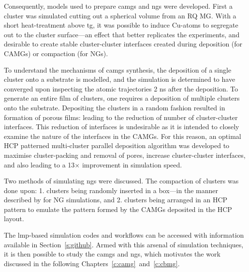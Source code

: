 Consequently, models used to prepare \gls{camg}s and \gls{ng}s were developed. First a cluster was simulated cutting out a spherical volume from an RQ MG. With a short heat-treatment above \gls{tg}, it was possible to induce Cu-atoms to segregate out to the cluster surface---an effect that better replicates the experiments, and desirable to create stable cluster-cluster interfaces created during deposition (for CAMGs) or compaction (for NGs). \par

To understand the mechanisms of \gls{camg}s synthesis, the deposition of a single cluster onto a substrate is modelled, and the simulation is determined to have converged upon inspecting the atomic trajectories 2 ns after the deposition. To generate an entire film of clusters, one requires a deposition of multiple clusters onto the substrate. Depositing the clusters in a random fashion resulted in formation of porous films: leading to the reduction of number of cluster-cluster interfaces. This reduction of interfaces is undesirable as it is intended to closely examine the nature of the interfaces in the CAMGs. For this reason, an optimal HCP patterned multi-cluster parallel deposition algorithm was developed to maximise cluster-packing and removal of pores, increase cluster-cluster interfaces, and also leading to a 13$\times$ improvement in simulation speed. \par

Two methods of simulating \gls{ng}s were discussed. The compaction of clusters was done upon: 1. clusters being randomly inserted in a box---in the manner described by \textcite{Adjaoud2018} for NG simulations, and 2. clusters being arranged in an HCP pattern to emulate the pattern formed by the CAMGs deposited in the HCP layout. \par

The \gls{lmp}-based simulation codes and workflows can be accessed with information available in Section~\ref{s:github}. Armed with this arsenal of simulation techniques, it is then possible to study the \gls{camg}s  and \gls{ng}s, which motivates the work discussed in the following Chapters~\ref{c:camg}~and~\ref{c:cbmg}. \par